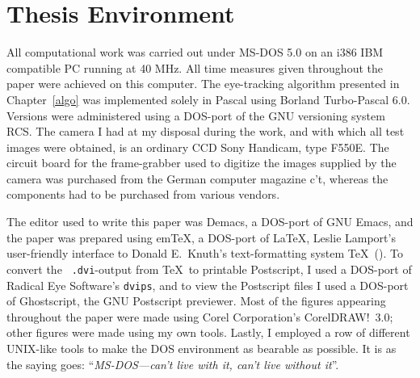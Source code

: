 
\section{Thesis Environment}
\label{intro:env}

All computational work was carried out under MS-DOS 5.0 on an i386 IBM
compatible PC running at 40 MHz.  All time measures given throughout
the paper were achieved on this computer.  The eye-tracking algorithm
{\octopus} presented in Chapter~\ref{algo} was implemented solely in
Pascal using Borland Turbo-Pascal 6.0.  Versions were administered
using a DOS-port of the GNU versioning system RCS.  The camera I had
at my disposal during the work, and with which all test images were
obtained, is an ordinary CCD Sony Handicam, type F550E.  The circuit
board for the frame-grabber used to digitize the images supplied by
the camera was purchased from the German computer magazine {\sf
  c't\/}, whereas the components had to be purchased from various
vendors.

The editor used to write this paper was Demacs, a DOS-port of GNU
Emacs, and the paper was prepared using em\TeX, a DOS-port of \LaTeX,
Leslie Lamport's user-friendly interface to Donald E.\ Knuth's
text-formatting system \TeX\ (\cite{lamport}).  To convert the {\tt
  .dvi}-output from \TeX\ to printable Postscript, I used a DOS-port
of Radical Eye Software's {\tt dvips}, and to view the Postscript
files I used a DOS-port of Ghostscript, the GNU Postscript previewer.
Most of the figures appearing throughout the paper were made using
Corel Corporation's CorelDRAW!\ 3.0; other figures were made using my
own tools.  Lastly, I employed a row of different UNIX-like tools to
make the DOS environment as bearable as possible.  It is as the saying
goes: ``{\em MS-DOS---can't live with it, can't live without it\/}''.
